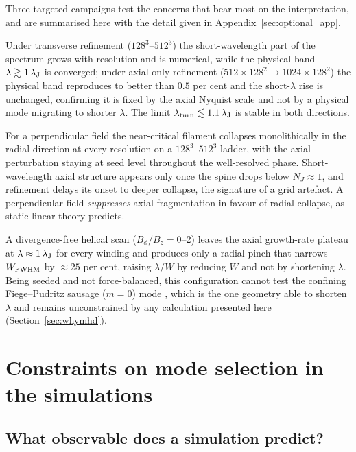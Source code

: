 \documentclass[usenatbib,twoside,twocolumn]{mnras}
\begin{document}
Three targeted campaigns test the concerns that bear most on the interpretation, and are summarised here with the detail given in Appendix~\ref{sec:optional_app}.

Under transverse refinement ($128^3$--$512^3$) the short-wavelength part of the spectrum grows with resolution and is numerical, while the physical band $\lambda\gtrsim1\,\lambda_{\rm J}$ is converged; under axial-only refinement ($512\times128^2\to1024\times128^2$) the physical band reproduces to better than $0.5$ per cent and the short-$\lambda$ rise is unchanged, confirming it is fixed by the axial Nyquist scale and not by a physical mode migrating to shorter $\lambda$. The limit $\lambda_{\rm turn}\lesssim1.1\,\lambda_{\rm J}$ is stable in both directions.

For a perpendicular field the near-critical filament collapses monolithically in the radial direction at every resolution on a $128^3$--$512^3$ ladder, with the axial perturbation staying at seed level throughout the well-resolved phase. Short-wavelength axial structure appears only once the spine drops below $N_J\approx1$, and refinement delays its onset to deeper collapse, the signature of a grid artefact. A perpendicular field \emph{suppresses} axial fragmentation in favour of radial collapse, as static linear theory predicts.

A divergence-free helical scan ($B_\phi/B_z=0$--$2$) leaves the axial growth-rate plateau at $\lambda\approx1\,\lambda_{\rm J}$ for every winding and produces only a radial pinch that narrows $W_{\rm FWHM}$ by $\approx25$ per cent, raising $\lambda/W$ by reducing $W$ and not by shortening $\lambda$. Being seeded and not force-balanced, this configuration cannot test the confining Fiege--Pudritz sausage ($m=0$) mode \citep{Fiege2000}, which is the one geometry able to shorten $\lambda$ and remains unconstrained by any calculation presented here (Section~\ref{sec:whymhd}).

\section{Constraints on mode selection in the simulations}
\label{sec:validation_endtoend}

\subsection{What observable does a simulation predict?}
\label{sec:whatobservable}
\end{document}
